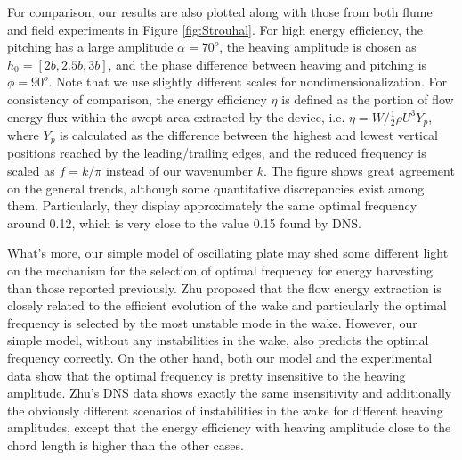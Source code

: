 For comparison, our results are also plotted along with those from both flume and field experiments in Figure \ref{fig:Strouhal}.
For high energy efficiency, the pitching has a large amplitude $\alpha = 70^o$, the heaving amplitude is chosen as $h_0 = [2b, 2.5b, 3b]$, and the phase difference between heaving and pitching is $\phi = 90^o$.
Note that we use slightly different scales for nondimensionalization.
For consistency of comparison, the energy efficiency $\eta$ is defined as the portion of flow energy flux within the swept area extracted by the device, i.e. $\eta = \overline{W} / \frac{1}{2} \rho U^3 Y_p$, where $Y_p$ is calculated as the difference between the highest and lowest vertical positions reached by the leading/trailing edges, and the reduced frequency is scaled as $f = k/\pi$ instead of our wavenumber $k$.
The figure shows great agreement on the general trends, although some quantitative discrepancies exist among them.
Particularly, they display approximately the same optimal frequency around 0.12, which is very close to the value 0.15 found by DNS.

What's more, our simple model of oscillating plate may shed some different light on the mechanism for the selection of optimal frequency for energy harvesting than those reported previously.
Zhu proposed that the flow energy extraction is closely related to the efficient evolution of the wake and particularly the optimal frequency is selected by the most unstable mode in the wake.
However, our simple model, without any instabilities in the wake, also predicts the optimal frequency correctly.
On the other hand, both our model and the experimental data show that the optimal frequency is pretty insensitive to the heaving amplitude.
Zhu's DNS data shows exactly the same insensitivity and additionally the obviously different scenarios of instabilities in the wake for different heaving amplitudes, except that the energy efficiency with heaving amplitude close to the chord length is higher than the other cases.

